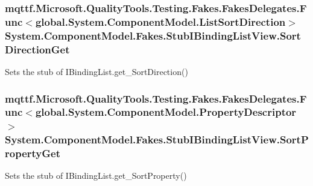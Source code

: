 \hypertarget{class_system_1_1_component_model_1_1_fakes_1_1_stub_i_binding_list_view_a0b5a5ec8efddeea35a6ce0875dc62f0c}{
\subsubsection[{Sort\-Direction\-Get}]{\setlength{\rightskip}{0pt plus 5cm}mqttf.\-Microsoft.\-Quality\-Tools.\-Testing.\-Fakes.\-Fakes\-Delegates.\-Func$<$global.\-System.\-Component\-Model.\-List\-Sort\-Direction$>$ System.\-Component\-Model.\-Fakes.\-Stub\-I\-Binding\-List\-View.\-Sort\-Direction\-Get}}\label{class_system_1_1_component_model_1_1_fakes_1_1_stub_i_binding_list_view_a0b5a5ec8efddeea35a6ce0875dc62f0c}


Sets the stub of I\-Binding\-List.\-get\-\_\-\-Sort\-Direction()

\hypertarget{class_system_1_1_component_model_1_1_fakes_1_1_stub_i_binding_list_view_a1e7923bce76c59a451065294191d1a2e}{
\subsubsection[{Sort\-Property\-Get}]{\setlength{\rightskip}{0pt plus 5cm}mqttf.\-Microsoft.\-Quality\-Tools.\-Testing.\-Fakes.\-Fakes\-Delegates.\-Func$<$global.\-System.\-Component\-Model.\-Property\-Descriptor$>$ System.\-Component\-Model.\-Fakes.\-Stub\-I\-Binding\-List\-View.\-Sort\-Property\-Get}}\label{class_system_1_1_component_model_1_1_fakes_1_1_stub_i_binding_list_view_a1e7923bce76c59a451065294191d1a2e}


Sets the stub of I\-Binding\-List.\-get\-\_\-\-Sort\-Property()

